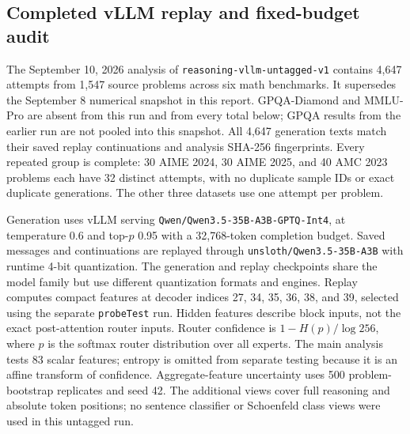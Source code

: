 \subsection{Completed vLLM replay and fixed-budget audit}
\label{sec:qwen-corr-audit}

The September 10, 2026 analysis of
\texttt{reasoning-vllm-untagged-v1} contains 4,647 attempts from 1,547 source
problems across six math benchmarks. It supersedes the September 8 numerical
snapshot in this report. GPQA-Diamond and MMLU-Pro are absent from this run
and from every total below; GPQA results from the earlier run are not pooled
into this snapshot. All 4,647 generation texts match their saved replay
continuations and analysis SHA-256 fingerprints. Every repeated group is
complete: 30 AIME 2024, 30 AIME 2025, and 40 AMC 2023 problems each have 32
distinct attempts, with no duplicate sample IDs or exact duplicate generations.
The other three datasets use one attempt per problem.

Generation uses vLLM serving \texttt{Qwen/Qwen3.5-35B-A3B-GPTQ-Int4}, at
temperature 0.6 and top-$p$ 0.95 with a 32,768-token completion budget. Saved
messages and continuations are replayed through
\texttt{unsloth/Qwen3.5-35B-A3B} with runtime 4-bit quantization. The generation
and replay checkpoints share the model family but use different quantization
formats and engines. Replay computes compact features at decoder indices
27, 34, 35, 36, 38, and 39, selected using the separate \texttt{probeTest} run.
Hidden features describe block inputs, not the exact post-attention router
inputs. Router confidence is $1-H(p)/\log 256$, where $p$ is the softmax router
distribution over all experts. The main analysis tests 83 scalar features;
entropy is omitted from separate testing because it is an affine transform
of confidence.
Aggregate-feature uncertainty uses 500 problem-bootstrap replicates and seed 42.
The additional views cover full reasoning and absolute token positions; no
sentence classifier or Schoenfeld class views were used in this untagged run.


